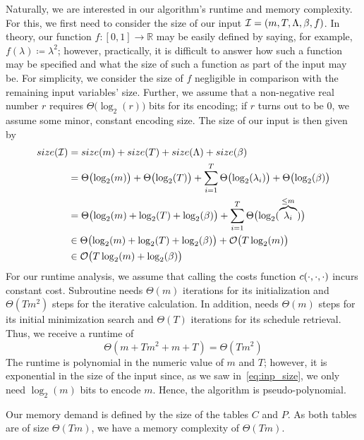 Naturally, we are interested in our algorithm's runtime and memory complexity.
For this, we first need to consider the size of our input $\mathcal{I}=(m,T,\Lambda,\beta,f)$. In theory, our function $f:[0,1]\rightarrow \mathbb{R}$ may be easily defined by saying, for example, $f(\lambda)\coloneqq \lambda^2$; however, practically, it is difficult to answer how such a function may be specified and what the size of such a function as part of the input may be. For simplicity, we consider the size of $f$ negligible in comparison with the remaining input variables' size. Further, we assume that a non-negative real number $r$ requires $\Theta\bigl(\log_2(r)\bigr)$ bits for its encoding; if $r$ turns out to be $0$, we assume some minor, constant encoding size. The size of our input is then given by
\begin{align}
	size(\mathcal{I})&=size(m)+size(T)+size(\Lambda)+size(\beta)\nonumber\\
	&=\Theta\bigl(\log_2(m)\bigr)+\Theta\bigl(\log_2(T)\bigr)+\sum\limits_{i=1}^T \Theta\bigl(\log_2(\lambda_i)\bigr)+\Theta\bigl(\log_2(\beta)\bigr)\nonumber\\
	&=\Theta\bigl(\log_2(m)+\log_2(T)+\log_2(\beta)\bigr)+\sum\limits_{i=1}^T \Theta\bigl(\log_2(\overbrace{\lambda_i}^{\le m})\bigr)\nonumber\\
	&\in\Theta\bigl(\log_2(m)+\log_2(T)+\log_2(\beta)\bigr)+\mathcal{O}\bigl(T\log_2(m)\bigr)\nonumber\\
	&\in\mathcal{O}\bigl(T\log_2(m)+\log_2(\beta)\bigr)\label{eq:inp_size}
\end{align}
For our runtime analysis, we assume that calling the costs function $c(\cdot,\cdot,\cdot)$ incurs constant cost. Subroutine  needs $\Theta(m)$ iterations for its initialization and $\Theta(Tm^2)$ steps for the iterative calculation. In addition,  needs $\Theta(m)$ steps for its initial minimization search and $\Theta(T)$ iterations for its schedule retrieval. Thus, we receive a runtime of 
\begin{equation*}
	\Theta(m+Tm^2+m+T)=\Theta(Tm^2)
\end{equation*}
The runtime is polynomial in the numeric value of $m$ and $T$; however, it is exponential in the size of the input since, as we saw in~\eqref{eq:inp_size}, we only need $\log_2(m)$ bits to encode $m$. Hence, the algorithm is pseudo-polynomial.

Our memory demand is defined by the size of the tables $C$ and $P$. As both tables are of size $\Theta(Tm)$, we have a memory complexity of $\Theta(Tm)$.

